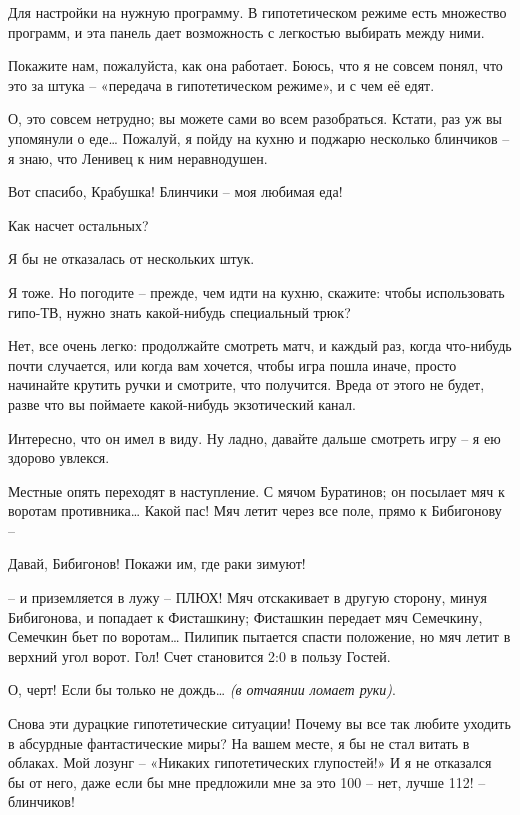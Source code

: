 \documentclass[../main.tex]{subfiles}
\begin{document}
\begin{dialogue}
 Для настройки на нужную программу. В гипотетическом режиме есть множество программ, и эта панель дает возможность с легкостью выбирать между ними.

 Покажите нам, пожалуйста, как она работает. Боюсь, что я не совсем понял, что это за штука \--- «передача в гипотетическом режиме», и с чем её едят.

 О, это совсем нетрудно; вы можете сами во всем разобраться. Кстати, раз уж вы упомянули о еде\ldots{} Пожалуй, я пойду на кухню и поджарю несколько блинчиков \--- я знаю, что Ленивец к ним неравнодушен.

 Вот спасибо, Крабушка! Блинчики \--- моя любимая еда!

 Как насчет остальных?

 Я бы не отказалась от нескольких штук.

 Я тоже. Но погодите \--- прежде, чем идти на кухню, скажите: чтобы использовать гипо-ТВ, нужно знать какой-нибудь специальный трюк?

 Нет, все очень легко: продолжайте смотреть матч, и каждый раз, когда что-нибудь почти случается, или когда вам хочется, чтобы игра пошла иначе, просто начинайте крутить ручки и смотрите, что получится. Вреда от этого не будет, разве что вы поймаете какой-нибудь экзотический канал.


 Интересно, что он имел в виду. Ну ладно, давайте дальше смотреть игру \--- я ею здорово увлекся.

 Местные опять переходят в наступление. С мячом Буратинов; он посылает мяч к воротам противника\ldots{} Какой пас! Мяч летит через все поле, прямо к Бибигонову \---

 Давай, Бибигонов! Покажи им, где раки зимуют!

 \--- и приземляется в лужу \--- ПЛЮХ! Мяч отскакивает в другую сторону, минуя Бибигонова, и попадает к Фисташкину; Фисташкин передает мяч Семечкину, Семечкин бьет по воротам\ldots{} Пилипик пытается спасти положение, но мяч летит в верхний угол ворот. Гол! Счет становится 2:0 в пользу Гостей.

 О, черт! Если бы только не дождь\ldots{} \emph{(в отчаянии ломает руки)}.

 Снова эти дурацкие гипотетические ситуации! Почему вы все так любите уходить в абсурдные фантастические миры? На вашем месте, я бы не стал витать в облаках. Мой лозунг \--- «Никаких гипотетических глупостей!» И я не отказался бы от него, даже если бы мне предложили мне за это 100 \--- нет, лучше 112! \--- блинчиков!


\end{dialogue}
\end{document}
